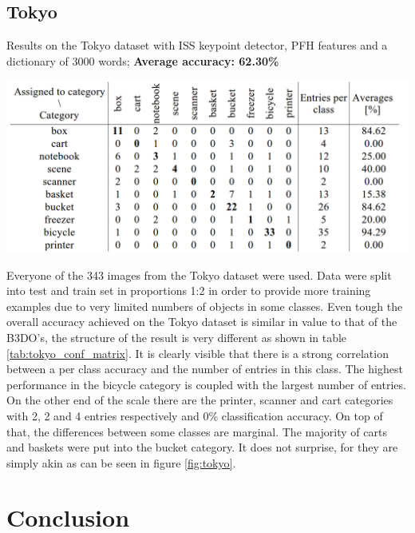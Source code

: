 \documentclass[12pt]{article}
\begin{document}
  \subsection{Tokyo}
    \begin{table}[!ht]
    \centering
    \caption{Results on the Tokyo dataset with ISS keypoint detector, PFH 
features and a dictionary of 3000 words; \textbf{Average accuracy: 62.30\%}}
    \includegraphics[width=1\textwidth]{../figs/tokyo_conf_matrix}	
    \label{tab:tokyo_conf_matrix}
    \end{table}

    Everyone of the 343 images from the Tokyo dataset were used. Data were 
split into test and train set in proportions 1:2 in order to provide more 
training examples due to very limited numbers of objects in some classes. Even 
tough the overall accuracy achieved on the Tokyo dataset is similar in value to 
that of the B3DO's, the structure of the result is very different as shown in 
table \ref{tab:tokyo_conf_matrix}. It is clearly visible that there is a strong 
correlation between a per class accuracy and the number of entries in this 
class. The highest performance in the bicycle category is coupled with the 
largest number of entries. On the other end of the scale there are the printer, 
scanner and cart categories with 2, 2 and 4 entries respectively and 0\% 
classification accuracy. On top of that, the differences between some classes 
are marginal. The majority of carts and baskets were put into the bucket 
category. It does not surprise, for they are simply akin as can be seen in 
figure \ref{fig:tokyo}.

\section{ Conclusion }
\end{document}
